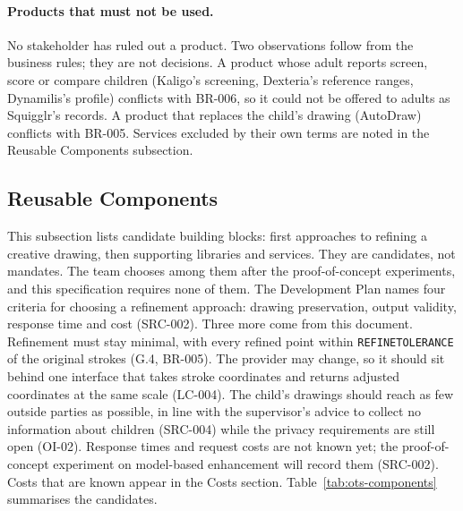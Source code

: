 \documentclass[12pt]{article}
\renewcommand{\_}{\textunderscore\allowbreak}%
\begin{document}
\paragraph{Products that must not be used.}
No stakeholder has ruled out a product. Two observations follow from the
business rules; they are not decisions. A product whose adult reports screen,
score or compare children (Kaligo's screening, Dexteria's reference ranges,
Dynamilis's profile) conflicts with BR-006, so it could not be offered to adults
as Squigglr's records. A product that replaces the child's drawing (AutoDraw)
conflicts with BR-005. Services excluded by their own terms are noted in the
Reusable Components subsection.

\subsection{Reusable Components}
\label{sec:ots-components}
This subsection lists candidate building blocks: first approaches to refining a
creative drawing, then supporting libraries and services. They are candidates,
not mandates. The team chooses among them after the proof-of-concept
experiments, and this specification requires none of them. The Development Plan
names four criteria for choosing a refinement approach: drawing preservation,
output validity, response time and cost (SRC-002). Three more come from this
document. Refinement must stay minimal, with every refined point within
\texttt{REFINE\_TOLERANCE} of the original strokes (G.4, BR-005). The provider
may change, so it should sit behind one interface that takes stroke coordinates
and returns adjusted coordinates at the same scale (LC-004). The child's
drawings should reach as few outside parties as possible, in line with the
supervisor's advice to collect no information about children (SRC-004) while the
privacy requirements are still open (OI-02). Response times and request costs
are not known yet; the proof-of-concept experiment on model-based enhancement
will record them (SRC-002). Costs that are known appear in the Costs section.
Table~\ref{tab:ots-components} summarises the candidates.
\end{document}
